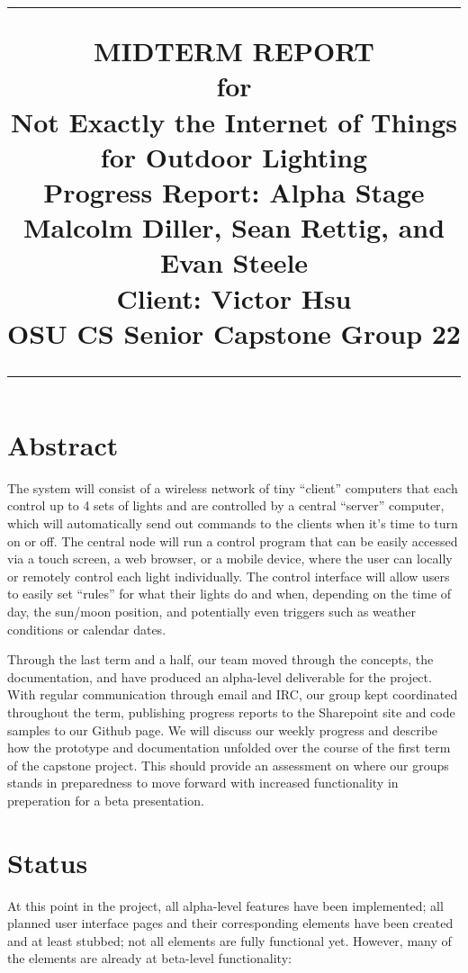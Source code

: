 \documentclass[oneside,openright]{book}
\title{
	\flushright
		\rule{16cm}{5pt}\vskip1cm
		\Huge{MIDTERM REPORT}\\
	for\\
		\vspace{2cm}
	Not Exactly the Internet of Things for Outdoor Lighting\\
		\vspace{2cm}
	\LARGE{Progress Report:}
	\vspace{2cm}
	\LARGE{Alpha Stage\\}
	\vspace{2cm}
	Malcolm Diller, Sean Rettig, and Evan Steele\\
        Client: Victor Hsu\\
        OSU CS Senior Capstone Group 22
		\vfill
		\rule{16cm}{5pt}
}
\date{}
\begin{document}
\maketitle
\tableofcontents
\newpage
{}
\section{Abstract}

The system will consist of a wireless network of tiny ``client'' computers that
each control up to 4 sets of lights and are controlled by a central ``server''
computer, which will automatically send out commands to the clients when it's
time to turn on or off.  The central node will run a control program that can 
be easily accessed via a touch screen, a web browser, or a mobile device, where
the user can locally or remotely control each light individually. The control interface 
will allow users to easily set ``rules'' for what their 
lights do and when, depending on the time of day, the sun/moon position, and 
potentially even triggers such as weather conditions or calendar dates. 

Through the last term and a half, our team moved through the concepts,
the documentation, and have produced an alpha-level
deliverable for the project. With regular communication through email and
IRC, our group kept coordinated throughout the term, publishing progress
reports to the Sharepoint site and code samples to our Github page. We will
discuss our weekly progress and describe how the prototype and documentation
unfolded over the course of the first term of the capstone project. This should
provide an assessment on where our groups stands in preparedness to move
forward with increased functionality in preperation for a beta presentation.

\pagebreak
\section{Status}

At this point in the project, all alpha-level features have been implemented;
all planned user interface pages and their corresponding elements have been
created and at least stubbed; not all elements are fully functional yet.
However, many of the elements are already at beta-level functionality:
\end{document}
